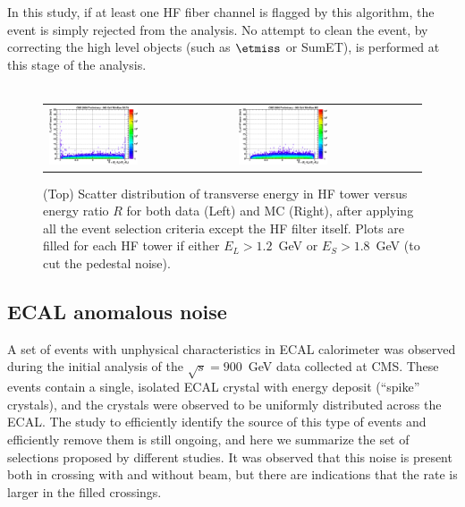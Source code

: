 \begin{itemize}
In this study, if at least one HF fiber channel is flagged by this algorithm, 
the event is simply rejected from the analysis. No attempt to clean the event, 
by correcting the high level objects (such as $\etmiss$ or SumET), 
is performed at this stage of the analysis. 
\\
\\
%
%
\begin{figure}[h!]
 \centering
 \begin{tabular}{ll}
  \includegraphics[width=0.5\textwidth]{plots_hcalnoise/hf_towerET_vs_ratio_DATA.eps} &
  \includegraphics[width=0.5\textwidth]{plots_hcalnoise/hf_towerET_vs_ratio_MC.eps} \\
 \end{tabular}
\caption{\small (Top) Scatter distribution of transverse energy in HF tower versus energy ratio $R$ for both data 
(Left) and MC (Right), after applying all the event selection criteria except the HF filter itself. 
Plots are filled for each HF tower if either $E_L>1.2$~GeV or $E_S>1.8$~GeV (to cut the pedestal noise).
\label{fig:hf_noise_ET_vs_R}}
\end{figure}
%
%
\end{itemize}

\subsection{ECAL anomalous noise}

A set of events with unphysical characteristics in ECAL calorimeter was
observed during the initial analysis of the $\sqrt{s}=900$~GeV data
collected at CMS. These events contain a single, isolated ECAL crystal
with energy deposit (``spike'' crystals), and the crystals were observed
to be uniformly distributed across the ECAL. The
study to efficiently identify the source of this type of events and
efficiently remove them is still ongoing, and here we summarize the set
of selections proposed by different studies. It was observed that this
noise is present both in crossing with and without beam, but there are
indications that the rate is larger in the filled crossings.

